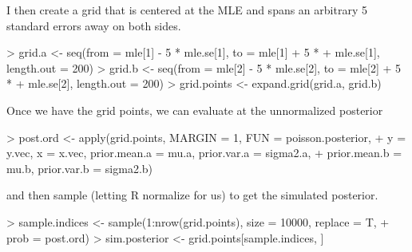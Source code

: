 \documentclass[handout]{beamer}
\begin{document}
\begin{frame}[fragile]
I then create a grid that is centered at the MLE and spans an
arbitrary 5 standard errors away on both sides.
\pause
\medskip
\tiny
\begin{Schunk}
\begin{Sinput}
> grid.a <- seq(from = mle[1] - 5 * mle.se[1], to = mle[1] + 5 * 
+     mle.se[1], length.out = 200)
> grid.b <- seq(from = mle[2] - 5 * mle.se[2], to = mle[2] + 5 * 
+     mle.se[2], length.out = 200)
> grid.points <- expand.grid(grid.a, grid.b)
\end{Sinput}
\end{Schunk}
\pause
\normalsize
\bigskip
Once we have the grid points, we can evaluate at the unnormalized posterior
\tiny
\pause
\medskip
\begin{Schunk}
\begin{Sinput}
> post.ord <- apply(grid.points, MARGIN = 1, FUN = poisson.posterior, 
+     y = y.vec, x = x.vec, prior.mean.a = mu.a, prior.var.a = sigma2.a, 
+     prior.mean.b = mu.b, prior.var.b = sigma2.b)
\end{Sinput}
\end{Schunk}
\pause
\bigskip
\normalsize
and then sample (letting R normalize for us) to get the simulated posterior.
\pause
\medskip
\tiny
\begin{Schunk}
\begin{Sinput}
> sample.indices <- sample(1:nrow(grid.points), size = 10000, replace = T, 
+     prob = post.ord)
> sim.posterior <- grid.points[sample.indices, ]
\end{Sinput}
\end{Schunk}
\normalsize
\end{frame}
\end{document}
